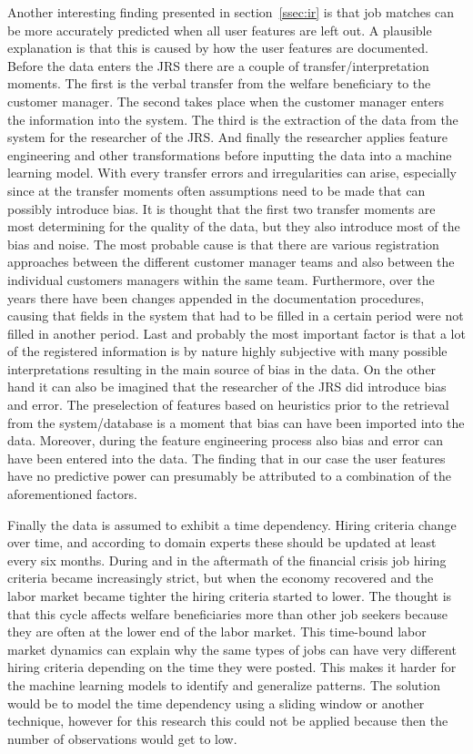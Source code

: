 Another interesting finding presented in section~\ref{ssec:ir} is that job matches can be more accurately predicted when all user features are left out.  
A plausible explanation is that this is caused by how the user features are documented.
Before the data enters the JRS there are a couple of transfer/interpretation moments. 
The first is the verbal transfer from the welfare beneficiary to the customer manager.
The second takes place when the customer manager enters the information into the system.
The third is the extraction of the data from the system for the researcher of the JRS.
And finally the researcher applies feature engineering and other transformations before inputting the data into a machine learning model.
With every transfer errors and irregularities can arise, especially since at the transfer moments often assumptions need to be made that can possibly introduce bias.
It is thought that the first two transfer moments are most determining for the quality of the data, but they also introduce most of the bias and noise. The most probable cause is that there are various registration approaches between the different customer manager teams and also between the individual customers managers within the same team. 
Furthermore, over the years there have been changes appended in the documentation procedures, causing that fields in the system that had to be filled in a certain period were not filled  in another period.
Last and probably the most important factor is that a lot of the registered information is by nature highly subjective with many possible interpretations resulting in the main source of bias in the data. 
On the other hand it can also be imagined that the researcher of the JRS did introduce bias and error.
The preselection of features based on heuristics prior to the retrieval from the system/database is a moment that bias can have been imported into the data.
Moreover, during the feature engineering process also bias and error can have been entered into the data.
The finding that in our case the user features have no predictive power can presumably be attributed to a combination of the aforementioned factors.

Finally the data is assumed to exhibit a time dependency.
Hiring criteria change over time, and according to domain experts these should be updated at least every six months. 
During and in the aftermath of the financial crisis job hiring criteria became increasingly strict, but when the economy recovered and the labor market became tighter the hiring criteria started to lower. 
The thought is that this cycle affects welfare beneficiaries more than other job seekers because they are often at the lower end of the labor market.
This time-bound labor market dynamics can explain why the same types of jobs can have very different hiring criteria depending on the time they were posted.
This makes it harder for the machine learning models to identify and generalize patterns.
The solution would be to model the time dependency using a sliding window or another technique, however for this research this could not be applied because then the number of observations would get to low.  

